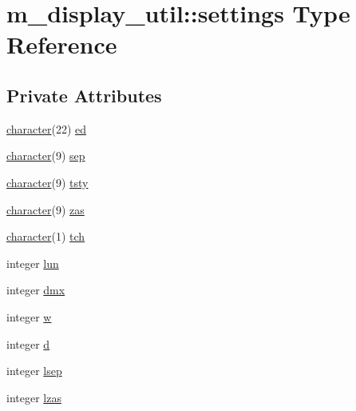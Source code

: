 \hypertarget{structm__display__util_1_1settings}{}\section{m\+\_\+display\+\_\+util\+:\+:settings Type Reference}
\label{structm__display__util_1_1settings}
\subsection*{Private Attributes}
\begin{DoxyCompactItemize}
\item 
\hyperlink{option__stopwatch_83_8txt_abd4b21fbbd175834027b5224bfe97e66}{character}(22) \hyperlink{structm__display__util_1_1settings_a2834b85cc506001092e5c03b0cb99249}{ed}
\item 
\hyperlink{option__stopwatch_83_8txt_abd4b21fbbd175834027b5224bfe97e66}{character}(9) \hyperlink{structm__display__util_1_1settings_ac6b88a3df7505dfda018fa65a5e9f105}{sep}
\item 
\hyperlink{option__stopwatch_83_8txt_abd4b21fbbd175834027b5224bfe97e66}{character}(9) \hyperlink{structm__display__util_1_1settings_aa44c905eb8019728ab7c29a035fffe46}{tsty}
\item 
\hyperlink{option__stopwatch_83_8txt_abd4b21fbbd175834027b5224bfe97e66}{character}(9) \hyperlink{structm__display__util_1_1settings_a2f91c5dcdbb75a1c307fff085d516abc}{zas}
\item 
\hyperlink{option__stopwatch_83_8txt_abd4b21fbbd175834027b5224bfe97e66}{character}(1) \hyperlink{structm__display__util_1_1settings_ab1c6c7523b3660ecda155d49db2b35d3}{tch}
\item 
integer \hyperlink{structm__display__util_1_1settings_af9e99479fa3069b7f5b9a49fad1338ca}{lun}
\item 
integer \hyperlink{structm__display__util_1_1settings_aa0350d08ea4df3bf1ce10823eedbb1ba}{dmx}
\item 
integer \hyperlink{structm__display__util_1_1settings_a20dd8f6afcf787f415d678459d08e3a4}{w}
\item 
integer \hyperlink{structm__display__util_1_1settings_ae723b191970109c2e0885e92cab1d52f}{d}
\item 
integer \hyperlink{structm__display__util_1_1settings_a114dc5a94988d6078b5ee8d4fa8b6a56}{lsep}
\item 
integer \hyperlink{structm__display__util_1_1settings_a8f7f9f26ee7420cae7fde083a9748265}{lzas}

\end{DoxyCompactItemize}
